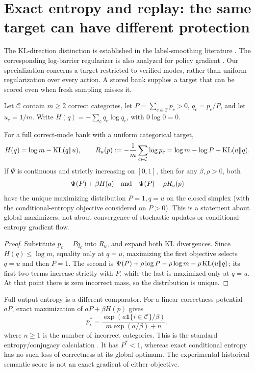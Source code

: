 \section{Exact entropy and replay: the same target can have different protection}
\label{sec:entropy-geometry}
The KL-direction distinction is established in the label-smoothing literature
\cite[Section~3.2]{pereyra2017}. The corresponding log-barrier regularizer is
also analyzed for policy gradient \cite[Section~5.2]{agarwal2021}. Our
specialization concerns a target restricted to verified modes, rather than
uniform regularization over every action. A stored bank supplies a target
that can be scored even when fresh sampling misses it.

Let $\mathcal C$ contain $m\ge2$ correct categories, let
$P=\sum_{c\in\mathcal C}p_c>0$, $q_c=p_c/P$, and let $u_c=1/m$.
Write $H(q)=-\sum_cq_c\log q_c$, with $0\log0=0$.
\begin{proposition}
\label{prop:entropy-objectives}
For a full correct-mode bank with a uniform categorical target,
\[
 H(q)=\log m-\operatorname{KL}(q\|u),\qquad
 R_u(p):=-\frac1m\sum_{c\in\mathcal C}\log p_c
 =\log m-\log P+\operatorname{KL}(u\|q).
\]
If $\Psi$ is continuous and strictly increasing on $[0,1]$, then for any
$\beta,\rho>0$, both
\[
 \Psi(P)+\beta H(q)
 \quad\hbox{and}\quad
 \Psi(P)-\rho R_u(p)
\]
have the unique maximizing distribution $P=1,q=u$ on the closed simplex
(with the conditional-entropy objective considered on $P>0$).
This is a statement about global maximizers, not about convergence of
stochastic updates or conditional-entropy gradient flow.
\end{proposition}
\begin{proof}
Substitute $p_c=Pq_c$ into $R_u$, and expand both KL divergences.
Since $H(q)\le\log m$, equality only at $q=u$, maximizing the first
objective selects $q=u$ and then $P=1$. The second is
$\Psi(P)+\rho\log P-\rho\log m-\rho\operatorname{KL}(u\|q)$; its first two terms
increase strictly with $P$, while the last is maximized only at $q=u$.
At that point there is zero incorrect mass, so the distribution is unique.
\end{proof}

Full-output entropy is a different comparator. For a linear correctness
potential $aP$, exact maximization of $aP+\beta H(p)$ gives
\[
 p_i^*=\frac{\exp(a\mathbf1\{i\in\mathcal C\}/\beta)}
 {m\exp(a/\beta)+n},
\]
where $n\ge1$ is the number of incorrect categories. This is the standard
entropy/conjugacy calculation \cite[Section~2.2]{geist2019}. It has
$P^*<1$, whereas exact conditional entropy has no such loss of correctness
at its global optimum. The experimental historical semantic score is not
an exact gradient of either objective.

